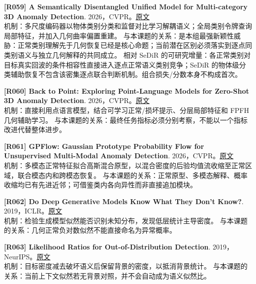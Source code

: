 \documentclass[11pt,a4paper]{article}
\begin{document}
\hypertarget{R059}{}\textbf{[R059] A Semantically Disentangled Unified Model for Multi-category 3D Anomaly Detection}. 2026，CVPR。\href{https://openaccess.thecvf.com/content/CVPR2026/papers/Kim_A_Semantically_Disentangled_Unified_Model_for_Multi-category_3D_Anomaly_Detection_CVPR_2026_paper.pdf}{原文}\\
机制：多尺度编码器以物体类别分类和监督对比学习解耦语义；全局类别令牌查询局部特征，并加入几何曲率偏置重建。 与本课题的关系：是本组最强新颖性威胁：正常类别理解先于几何恢复已经是核心命题；当前潜在区别必须落实到逐点同类别语义与独立几何解释的共同成立。 相对 SeDiR 的可研究增量：各正常类别对目标真实回波的条件相容性直接进入逐点正常语义类别竞争；SeDiR 的物体级分类辅助恢复不包含该密集逐点联合判断机制。组合损失/分数本身不构成首次。\par\medskip
\hypertarget{R060}{}\textbf{[R060] Back to Point: Exploring Point-Language Models for Zero-Shot 3D Anomaly Detection}. 2026，CVPR。\href{https://openaccess.thecvf.com/content/CVPR2026/papers/Li_Back_to_Point_Exploring_Point-Language_Models_for_Zero-Shot_3D_Anomaly_CVPR_2026_paper.pdf}{原文}\\
机制：直接利用点语言模型，结合可学习正常/损坏提示、分层局部特征和 FPFH 几何辅助学习。 与本课题的关系：最终任务指标必须分别考察，不能以一个指标改进代替整体进步。\par\medskip
\hypertarget{R061}{}\textbf{[R061] GPFlow: Gaussian Prototype Probability Flow for Unsupervised Multi-Modal Anomaly Detection}. 2026，CVPR。\href{https://openaccess.thecvf.com/content/CVPR2026/papers/Li_GPFlow_Gaussian_Prototype_Probability_Flow_for_Unsupervised_Multi-Modal_Anomaly_Detection_CVPR_2026_paper.pdf}{原文}\\
机制：多模态正常特征拟合高斯混合原型，以混合密度的后验均值流收缩至正常区域，联合模态内和跨模态恢复。 与本课题的关系：正常原型、多模态解释、概率收缩均已有先进近邻；可借鉴类内各向异性而非直接追加模块。\par\medskip
\hypertarget{R062}{}\textbf{[R062] Do Deep Generative Models Know What They Don't Know?}. 2019，ICLR。\href{https://arxiv.org/pdf/1810.09136}{原文}\\
机制：检验生成模型似然能否识别未知分布，发现低层统计主导密度。 与本课题的关系：几何正常负对数似然不能直接命名为异常概率。\par\medskip
\hypertarget{R063}{}\textbf{[R063] Likelihood Ratios for Out-of-Distribution Detection}. 2019，NeurIPS。\href{https://arxiv.org/pdf/1906.02845}{原文}\\
机制：目标密度减去破坏语义后保留背景的密度，以抵消背景统计。 与本课题的关系：当前上下文似然若无背景对照，并不会自动成为语义似然比。\par\medskip
\end{document}
